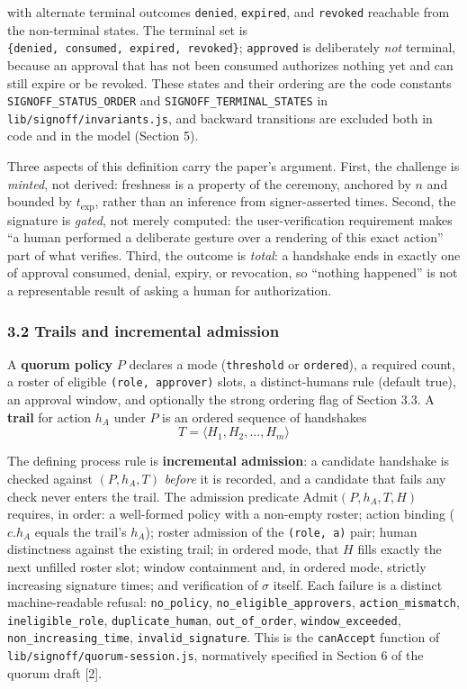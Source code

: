 \documentclass[
  11pt,
]{article}
\begin{document}
with alternate terminal outcomes \texttt{denied}, \texttt{expired}, and
\texttt{revoked} reachable from the non-terminal states. The terminal
set is \texttt{\{denied,\ consumed,\ expired,\ revoked\}};
\texttt{approved} is deliberately \emph{not} terminal, because an
approval that has not been consumed authorizes nothing yet and can still
expire or be revoked. These states and their ordering are the code
constants \texttt{SIGNOFF\_STATUS\_ORDER} and
\texttt{SIGNOFF\_TERMINAL\_STATES} in
\texttt{lib/signoff/invariants.js}, and backward transitions are
excluded both in code and in the model (Section 5).

Three aspects of this definition carry the paper's argument. First, the
challenge is \emph{minted}, not derived: freshness is a property of the
ceremony, anchored by $n$ and bounded by $t_{\mathrm{exp}}$, rather
than an inference from signer-asserted times. Second, the signature is
\emph{gated}, not merely computed: the user-verification requirement
makes ``a human performed a deliberate gesture over a rendering of this
exact action'' part of what verifies. Third, the outcome is
\emph{total}: a handshake ends in exactly one of approval consumed,
denial, expiry, or revocation, so ``nothing happened'' is not a
representable result of asking a human for authorization.

\subsubsection{3.2 Trails and incremental
admission}\label{trails-and-incremental-admission}

A \textbf{quorum policy} $P$ declares a mode (\texttt{threshold} or
\texttt{ordered}), a required count, a roster of eligible
\texttt{(role,\ approver)} slots, a distinct-humans rule (default true),
an approval window, and optionally the strong ordering flag of Section
3.3. A \textbf{trail} for action $h_A$ under $P$ is an ordered sequence
of handshakes
\[
T = \langle H_1, H_2, \ldots, H_m \rangle
\]

The defining process rule is \textbf{incremental admission}: a candidate
handshake is checked against $(P, h_A, T)$ \emph{before} it is
recorded, and a candidate that fails any check never enters the trail.
The admission predicate $\mathrm{Admit}(P, h_A, T, H)$ requires, in
order: a well-formed policy with a non-empty roster; action binding
($c.h_A$ equals the trail's $h_A$); roster admission of the
\texttt{(role,\ a)} pair; human distinctness against the existing trail;
in ordered mode, that $H$ fills exactly the next unfilled roster slot;
window containment and, in ordered mode, strictly increasing signature
times; and verification of $\sigma$ itself. Each failure is a distinct
machine-readable refusal: \texttt{no\_policy},
\texttt{no\_eligible\_approvers}, \texttt{action\_mismatch},
\texttt{ineligible\_role}, \texttt{duplicate\_human},
\texttt{out\_of\_order}, \texttt{window\_exceeded},
\texttt{non\_increasing\_time}, \texttt{invalid\_signature}. This is the
\texttt{canAccept} function of \texttt{lib/signoff/quorum-session.js},
normatively specified in Section 6 of the quorum draft {[}2{]}.
\end{document}
